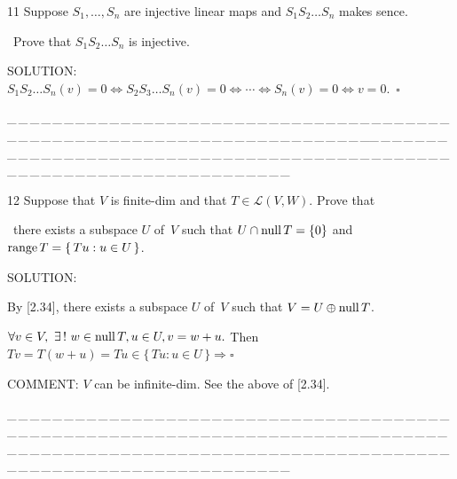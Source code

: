 \documentclass[a4paper, 11pt, UTF8]{article}
\def\range{\textup{range}\,}
\def\null{\textup{null\,}}
\def\Lm{\mathcal{L}}
\begin{document}
\begin{large}
{\timesbf\Large 11} {\timessl\Large 
Suppose $S_1,\dots,S_n$ are injective linear maps and $S_1 S_2\dots S_n$ makes sence.}\par\quad\,
{\timessl\Large Prove that $S_1 S_2\dots S_n$ is injective.
}\par
{\timesbf S\footnotesize{OLUTION:}}\,\,\,$S_1 S_2\dots S_n(v)=0\Longleftrightarrow S_2 S_3\dots S_n(v)=0\Longleftrightarrow\cdots\Longleftrightarrow S_n(v)=0\Longleftrightarrow v=0.\,\,\,\square$\par
{\tiny \_\,\_\,\_\,\_\,\_\,\_\,\_\,\_\,\_\,\_\,\_\,\_\,\_\,\_\,\_\,\_\,\_\,\_\,\_\,\_\,\_\,\_\,\_\,\_\,\_\,\_\,\_\,\_\,\_\,\_\,\_\,\_\,\_\,\_\,\_\,\_\,\_\,\_\,\_\,\_\,\_\,\_\,\_\,\_\,\_\,\_\,\_\,\_\,\_\,\_\,\_\,\_\,\_\,\_\,\_\,\_\,\_\,\_\,\_\,\_\,\_\,\_\,\_\,\_\,\_\,\_\,\_\,\_\,\_\,\_\,\_\_\,\_\,\_\,\_\,\_\,\_\,\_\,\_\,\_\,\_\,\_\,\_\,\_\,\_\,\_\,\_\,\_\,\_\,\_\,\_\,\_\,\_\,\_\,\_\,\_\,\_\,\_\,\_\,\_\,\_\,\_\,\_\,\_\,\_\,\_\,\_\,\_\,\_\,\_\,\_\,\_\,\_\,\_\,\_\,\_\,\_\,\_\,\_\,\_\,\_\,\_\,\_\,\_\,\_\,\_\,\_\,\_\,\_\,\_\,\_\,\_\,\_\,\_\,\_\,\_\,\_\,\_\,\_\,\_\,\_\,\_}\par

{\timesbf\Large 12} {\timessl\Large 
Suppose that $V$ is finite-dim and that $T\in\Lm(V, W)$. Prove that}\par\quad\,
{\timessl\Large there exists a subspace $U$ of \,$V$ such that $U\cap\null T=\{0\}$ and $\range T = \{\,Tu:u\in U\,\}$.
}\par
{\timesbf S\footnotesize{OLUTION:}}\par\quad
By [2.34], there exists a subspace $U$ of \,$V$ such that $V=U\oplus\null T$.\par\quad
$\forall v\in V,\,\,\exists\,!\,\,w\in\null T,u\in U, v=w+u.$ Then $Tv=T(w+u)=Tu\in\{\,Tu:u\in U\,\}\Rightarrow\square$\par
{\timesbf C\small{OMMENT:}} $V$ can be infinite-dim. See the above of [2.34].
\par
{\tiny \_\,\_\,\_\,\_\,\_\,\_\,\_\,\_\,\_\,\_\,\_\,\_\,\_\,\_\,\_\,\_\,\_\,\_\,\_\,\_\,\_\,\_\,\_\,\_\,\_\,\_\,\_\,\_\,\_\,\_\,\_\,\_\,\_\,\_\,\_\,\_\,\_\,\_\,\_\,\_\,\_\,\_\,\_\,\_\,\_\,\_\,\_\,\_\,\_\,\_\,\_\,\_\,\_\,\_\,\_\,\_\,\_\,\_\,\_\,\_\,\_\,\_\,\_\,\_\,\_\,\_\,\_\,\_\,\_\,\_\,\_\_\,\_\,\_\,\_\,\_\,\_\,\_\,\_\,\_\,\_\,\_\,\_\,\_\,\_\,\_\,\_\,\_\,\_\,\_\,\_\,\_\,\_\,\_\,\_\,\_\,\_\,\_\,\_\,\_\,\_\,\_\,\_\,\_\,\_\,\_\,\_\,\_\,\_\,\_\,\_\,\_\,\_\,\_\,\_\,\_\,\_\,\_\,\_\,\_\,\_\,\_\,\_\,\_\,\_\,\_\,\_\,\_\,\_\,\_\,\_\,\_\,\_\,\_\,\_\,\_\,\_\,\_\,\_\,\_\,\_\,\_}\par


\end{large}
\end{document}
